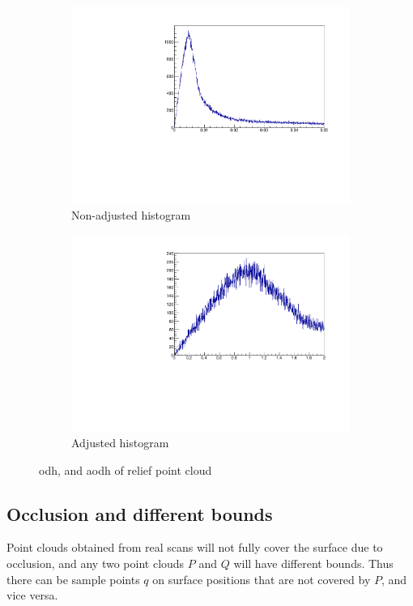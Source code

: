 \begin{figure}[h]
\hspace*{\fill}%
\begin{subfigure}{.4\textwidth}
	\includegraphics[width=\linewidth]{fig/relief_noadj.pdf}
	\caption{Non-adjusted histogram}
\end{subfigure}%
\hfill{}%
\begin{subfigure}{.4\textwidth}
	\includegraphics[width=\linewidth]{fig/relief_adj.pdf}
	\caption{Adjusted histogram}
\end{subfigure}
\hspace*{\fill}%
\caption{\Gls{odh}, and \gls{aodh} of relief point cloud}
\label{fig:relief_adj}
\end{figure}


\subsection{Occlusion and different bounds}
Point clouds obtained from real scans will not fully cover the surface due to occlusion, and any two point clouds $P$ and $Q$ will have different bounds. Thus there can be sample points $q$ on surface positions that are not covered by $P$, and vice versa.

